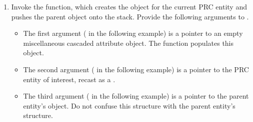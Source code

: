 \documentclass[letterpaper,12pt,english,openany,oneside]{sphinxmanual}
\begin{document}
\begin{sphinxVerbatim}[commandchars=\\\{\}]
   
\end{sphinxVerbatim}
\begin{enumerate}
%
\setcounter{enumi}{1}
\item {} 
Invoke the  function, which creates the  object for the current PRC entity and pushes the parent  object onto the stack. Provide the following arguments to .
\begin{itemize}
\item {} 
The first argument ( in the following example) is a pointer to an empty miscellaneous cascaded attribute object. The  function populates this object.

\item {} 
The second argument ( in the following example) is a pointer to the PRC entity of interest, recast as a .

\item {} 
The third argument ( in the following example) is a pointer to the parent entity’s  object. Do not confuse this structure with the parent entity’s  structure.

\end{itemize}

\end{enumerate}
\end{document}
